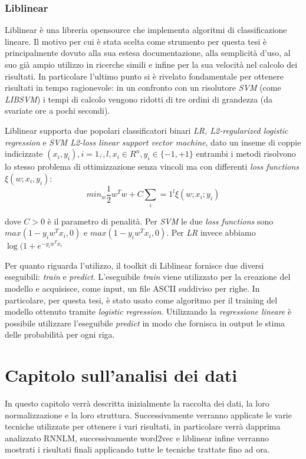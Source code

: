 \documentclass[a4paper,12pt,openright,twoside]{report}
\theoremstyle{definition}
\begin{document}
\subsection{Liblinear}
Liblinear è una libreria opensource che implementa algoritmi di classificazione lineare. Il motivo
per cui è stata scelta come strumento per questa
tesi è principalmente dovuto alla sua estesa documentazione, alla semplicità
d'uso, al suo già ampio utilizzo in ricerche simili e infine per la sua velocità nel calcolo dei risultati. 
In particolare l'ultimo punto si è rivelato fondamentale
per ottenere risultati in tempo ragionevole: in un confronto con un risolutore \emph{SVM} (come \emph{LIBSVM})
i tempi di calcolo vengono ridotti di tre ordini di grandezza (da svariate ore a pochi secondi).

Liblinear supporta due popolari classificatori binari \emph{LR, L2-regularized logistic regression} e 
\emph{SVM L2-loss linear support vector machine}, dato un inseme di coppie
indicizzate $(x_i,y_i),i=1,\dot{},l,x_i\in R^n, y_i \in \{-1,+1\}$ entrambi i metodi risolvono lo stesso
problema di ottimizzazione senza vincoli ma con differenti \emph{loss functions} $\xi(w;x_i,y_i)$:
\begin{equation}
	min_w \frac{1}{2}w^Tw+C\sum_i=1^l\xi(w;x_i;y_i)
	\label{eqn:liblinear1}
\end{equation}

dove $C > 0$ è il parametro di penalità. Per \emph{SVM} le due \emph{loss functions} sono $max(1-y_iw^Tx_i,0)$ e
$max(1-y_iw^Tx_i,0)$. Per \emph{LR} invece abbiamo $\log(1+e^{-y_iw^Tx_i}$

Per quanto riguarda l'utilizzo, il toolkit di Liblinear fornisce due diversi eseguibili: \emph{train} e 
\emph{predict}.
L'eseguibile \emph{train} viene utilizzato per la creazione del modello e acquisisce, come input, un file
ASCII suddiviso per righe. In particolare, per questa tesi, è stato usato come algoritmo 
per il training del modello ottenuto tramite \emph{logistic regression}.
Utilizzando la \emph{regressione lineare} è possibile utilizzare l'eseguibile \emph{predict} in modo 
che fornisca in output le stima delle probabilità per ogni riga.

\chapter{Capitolo sull'analisi dei dati}
In questo capitolo verrà descritta inizialmente la raccolta dei dati, la loro normalizzazione e la loro struttura.
Successivamente verranno applicate le varie tecniche utilizzate per ottenere i vari risultati, in particolare verrà dapprima
analizzato RNNLM, successivamente word2vec e liblinear infine verranno mostrati i risultati finali applicando
tutte le tecniche trattate fino ad ora.
\end{document}
